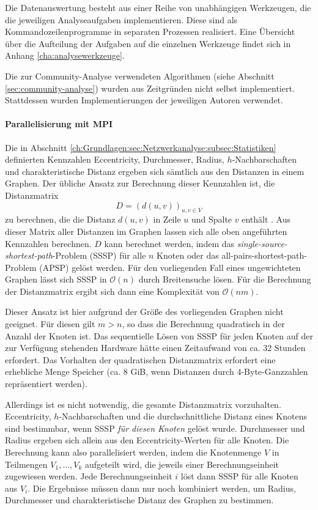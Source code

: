 Die Datenauswertung besteht aus einer Reihe von unabhängigen
Werkzeugen, die die jeweiligen Analyseaufgaben implementieren. Diese
sind als Kommandozeilenprogramme in separaten Prozessen
realisiert. Eine Übersicht über die Aufteilung der Aufgaben auf
die einzelnen Werkzeuge findet sich in Anhang
\ref{cha:analysewerkzeuge}.

Die zur Community-Analyse verwendeten Algorithmen (siehe Abschnitt
\ref{sec:community-analyse}) wurden aus Zeitgründen nicht selbst
implementiert. Stattdessen wurden Implementierungen der jeweiligen
Autoren verwendet.

\paragraph{Parallelisierung mit MPI}
\label{sec:parall-mitt-mpi}

Die in Abschnitt
\ref{ch:Grundlagen:sec:Netzwerkanalyse:subsec:Statistiken} definierten
Kennzahlen Eccentricity, Durchmesser, Radius, $h$-Nachbarschaften und
charakteristische Distanz ergeben sich sämtlich aus den Distanzen in
einem Graphen. Der übliche Ansatz zur Berechnung dieser Kennzahlen
ist, die Distanzmatrix
\begin{equation}
  \label{eq:7}
  D = (d(u, v))_{u, v\in V}
\end{equation}
zu berechnen, die die Distanz $d(u, v)$ in Zeile $u$ und Spalte $v$
enthält \cite{Brinkmeier2004}. Aus dieser Matrix aller Distanzen im
Graphen lassen sich alle oben angeführten Kennzahlen berechnen. $D$
kann berechnet werden, indem das
\textit{single-source-shortest-path}-Problem
(SSSP) für alle $n$ Knoten oder das all-pairs-shortest-path-Problem
(APSP) gelöst werden. Für den vorliegenden Fall eines
ungewichteten Graphen lässt sich SSSP in $\mathcal{O}(n)$ durch
Breitensuche lösen. Für die Berechnung der Distanzmatrix ergibt
sich dann eine Komplexität von $\mathcal{O}(nm)$.

Dieser Ansatz ist hier aufgrund der Größe des vorliegenden Graphen
nicht geeignet. Für diesen gilt $m > n$, so dass die Berechnung
quadratisch in der Anzahl der Knoten ist. Das sequentielle Lösen von
SSSP für jeden Knoten auf der zur Verfügung stehenden Hardware
hätte einen Zeitaufwand von ca. 32 Stunden erfordert. Das Vorhalten
der quadratischen Distanzmatrix erfordert eine erhebliche Menge
Speicher (ca. 8 GiB, wenn Distanzen durch 4-Byte-Ganzzahlen
repräsentiert werden).

Allerdings ist es nicht notwendig, die gesamte Distanzmatrix
vorzuhalten. Eccentricity, $h$-Nachbarschaften und die
durchschnittliche Distanz eines Knotens sind bestimmbar, wenn SSSP
\emph{für diesen Knoten} gelöst wurde. Durchmesser und Radius
ergeben sich allein aus den Eccentricity-Werten für alle Knoten. Die
Berechnung kann also parallelisiert werden, indem die Knotenmenge $V$
in Teilmengen $V_1, \dots, V_k$ aufgeteilt wird, die jeweils einer
Berechnungseinheit zugewiesen werden. Jede Berechnungseinheit $i$
löst dann SSSP für alle Knoten aus $V_i$. Die Ergebnisse müssen
dann nur noch kombiniert werden, um Radius, Durchmesser und
charakteristische Distanz des Graphen zu bestimmen.

